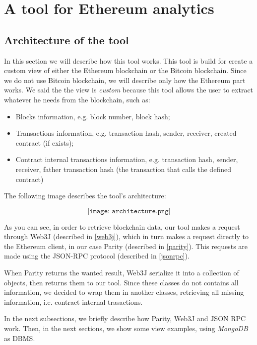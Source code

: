 \label{Chapter3}

\chapter{A tool for Ethereum analytics}
\section{Architecture of the tool}
In this section we will describe how this tool works. This tool is build for create a custom view of either the Ethereum blockchain or the Bitcoin blockchain. Since we do not use Bitcoin blockchain, we will describe only how the Ethereum part works. We said the the view is \textit{custom} because this tool allows the user to extract whatever he needs from the blockchain, such as:
\begin{itemize}
    \item Blocks information, e.g. block number, block hash;
    \item Transactions information, e.g. transaction hash, sender, receiver, created contract (if exists);
    \item Contract internal transactions information, e.g. transaction hash, sender, receiver, father transaction hash (the transaction that calls the defined contract)
\end{itemize}

The following image describes the tool's architecture:
\begin{center}
    \[
        \texttt{[image: architecture.png]}
    \]
\end{center}
As you can see, in order to retrieve blockchain data, our tool makes a request through Web3J (described in \ref{web3j}), which in turn makes a request directly to the Ethereum client, in our case Parity (described in \ref{parity}). This requests are made using the JSON-RPC protocol (described in \ref{jsonrpc}). 

When Parity returns the wanted result, Web3J serialize it into a collection of objects, then returns them to our tool. Since these classes do not contains all information, we decided to wrap them in another classes, retrieving all missing information, i.e. contract internal trasactions.

In the next subsections, we briefly describe how Parity, Web3J and JSON RPC work. Then, in the next sections, we show some view examples, using \textit{MongoDB} as DBMS.

